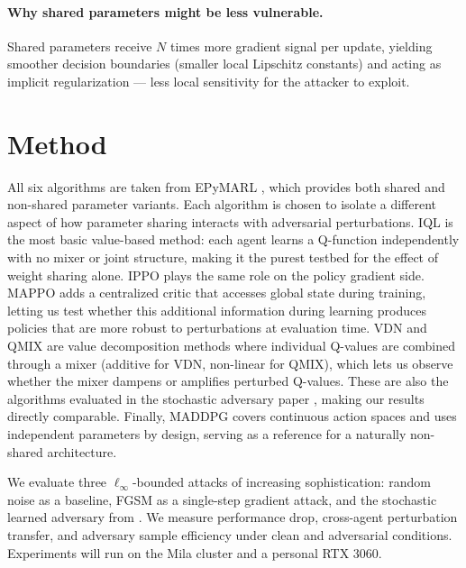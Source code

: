 \documentclass{article}
\begin{document}
\paragraph{Why shared parameters might be less vulnerable.}
Shared parameters receive $N$ times more gradient signal per update, yielding smoother decision boundaries (smaller local Lipschitz constants) and acting as implicit regularization --- less local sensitivity for the attacker to exploit.


\section{Method}
All six algorithms are taken from EPyMARL \citep{christianos2020epymarl}, which provides both shared and non-shared parameter variants. Each algorithm is chosen to isolate a different aspect of how parameter sharing interacts with adversarial perturbations. IQL is the most basic value-based method: each agent learns a Q-function independently with no mixer or joint structure, making it the purest testbed for the effect of weight sharing alone. IPPO plays the same role on the policy gradient side. MAPPO adds a centralized critic that accesses global state during training, letting us test whether this additional information during learning produces policies that are more robust to perturbations at evaluation time. VDN and QMIX are value decomposition methods where individual Q-values are combined through a mixer (additive for VDN, non-linear for QMIX), which lets us observe whether the mixer dampens or amplifies perturbed Q-values. These are also the algorithms evaluated in the stochastic adversary paper \citep{zhou2025robust}, making our results directly comparable. Finally, MADDPG covers continuous action spaces and uses independent parameters by design, serving as a reference for a naturally non-shared architecture.

We evaluate three $\ell_\infty$-bounded attacks of increasing sophistication: random noise as a baseline, FGSM \citep{goodfellow2014explaining} as a single-step gradient attack, and the stochastic learned adversary from \citet{zhou2025robust}. We measure performance drop, cross-agent perturbation transfer, and adversary sample efficiency under clean and adversarial conditions. Experiments will run on the Mila cluster and a personal RTX 3060.
\end{document}
